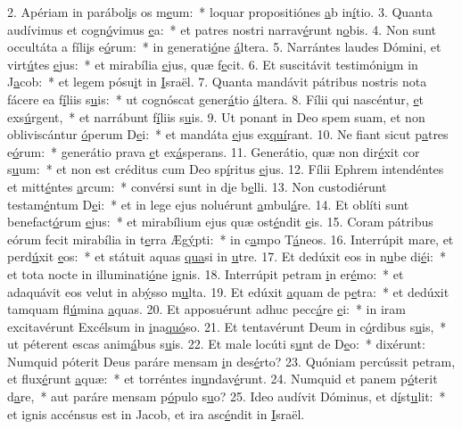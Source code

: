 2. Apériam in parábol\uline{i}s os m\uline{e}um:~* loquar propositiónes \uline{a}b in\uline{í}tio.
3. Quanta audívimus et cogn\uline{ó}vimus \uline{e}a:~* et patres nostri narrav\uline{é}runt n\uline{o}bis.
4. Non sunt occultáta a fíli\uline{i}s e\uline{ó}rum:~* in generati\uline{ó}ne \uline{á}ltera.
5. Narrántes laudes Dómini, et virt\uline{ú}tes \uline{e}jus:~* et mirabília \uline{e}jus, quæ f\uline{e}cit.
6. Et suscitávit testimóni\uline{u}m in J\uline{a}cob:~* et legem pósu\uline{i}t in \uline{I}sraël.
7. Quanta mandávit pátribus nostris nota fácere ea f\uline{í}liis s\uline{u}is:~* ut cognóscat gener\uline{á}tio \uline{á}ltera.
8. Fílii qui nascéntur, \uline{e}t exs\uline{ú}rgent,~* et narrábunt f\uline{í}liis s\uline{u}is.
9. Ut ponant in Deo spem suam, et non obliviscántur \uline{ó}perum D\uline{e}i:~* et mandáta \uline{e}jus ex\uline{quí}rant.
10. Ne fiant sicut p\uline{a}tres e\uline{ó}rum:~* generátio prava \uline{e}t ex\uline{á}sperans.
11. Generátio, quæ non dir\uline{é}xit cor s\uline{u}um:~* et non est créditus cum Deo sp\uline{í}ritus \uline{e}jus.
12. Fílii Ephrem intendéntes et mitt\uline{é}ntes \uline{a}rcum:~* convérsi sunt in d\uline{i}e b\uline{e}lli.
13. Non custodiérunt testam\uline{é}ntum D\uline{e}i:~* et in lege ejus noluérunt \uline{a}mbul\uline{á}re.
14. Et oblíti sunt benefact\uline{ó}rum \uline{e}jus:~* et mirabílium ejus quæ ost\uline{é}ndit \uline{e}is.
15. Coram pátribus eórum fecit mirabília in t\uline{e}rra Æg\uline{ý}pti:~* in c\uline{a}mpo T\uline{á}neos.
16. Interrúpit mare, et perd\uline{ú}xit \uline{e}os:~* et státuit aquas \uline{qua}si in \uline{u}tre.
17. Et dedúxit eos in n\uline{u}be di\uline{é}i:~* et tota nocte in illuminati\uline{ó}ne \uline{i}gnis.
18. Interrúpit petram \uline{i}n er\uline{é}mo:~* et adaquávit eos velut in ab\uline{ý}sso m\uline{u}lta.
19. Et edúxit \uline{a}quam de p\uline{e}tra:~* et dedúxit tamquam fl\uline{ú}mina \uline{a}quas.
20. Et apposuérunt adhuc pecc\uline{á}re \uline{e}i:~* in iram excitavérunt Excélsum in \uline{i}na\uline{quó}so.
21. Et tentavérunt Deum in c\uline{ó}rdibus s\uline{u}is,~* ut péterent escas anim\uline{á}bus s\uline{u}is.
22. Et male locúti s\uline{u}nt de D\uline{e}o:~* dixérunt: Numquid póterit Deus paráre mensam \uline{i}n des\uline{é}rto?
23. Quóniam percússit petram, et flux\uline{é}runt \uline{a}quæ:~* et torréntes in\uline{u}ndav\uline{é}runt.
24. Numquid et panem p\uline{ó}terit d\uline{a}re,~* aut paráre mensam p\uline{ó}pulo s\uline{u}o?
25. Ideo audívit Dóminus, et d\uline{í}st\uline{u}lit:~* et ignis accénsus est in Jacob, et ira asc\uline{é}ndit in \uline{I}sraël.
